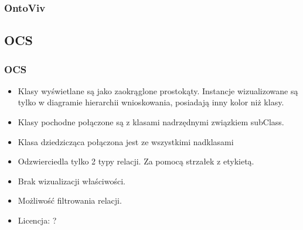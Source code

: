 \documentclass{beamer}
\begin{document}
\begin{frame}
  \frametitle{OntoViv}
\begin{center}
\end{center}
\end{frame}


\subsection{OCS}
\begin{frame}
  \frametitle{OCS}
  \begin{itemize}
    \item Klasy wyświetlane są jako zaokrąglone prostokąty. Instancje wizualizowane są tylko w diagramie hierarchii wnioskowania, posiadają inny kolor niż klasy.
    \item Klasy pochodne połączone są z klasami nadrzędnymi związkiem subClass.  
    \item Klasa dziedzicząca połączona jest ze wszystkimi nadklasami
    \item Odzwierciedla tylko 2 typy relacji. Za pomocą strzałek z etykietą.
    \item Brak wizualizacji właściwości. 
    \item Możliwość filtrowania relacji.
    \item Licencja: ?
  \end{itemize}

\end{frame}
\end{document}

